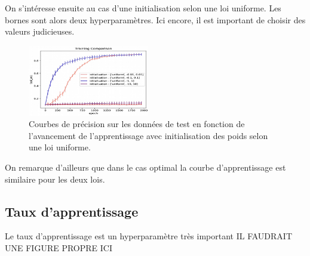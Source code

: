 On s'intéresse ensuite au cas d'une initialisation selon une loi uniforme. Les bornes sont alors deux hyperparamètres. Ici encore, il est important de choisir des valeurs judicieuses.


\begin{figure}[!h]
\centering
\includegraphics[width=150pt]{"images/MLP/MLP_inituni"}
\caption{Courbes de précision sur les données de test en fonction de l'avancement de l'apprentissage avec initialisation des poids selon une loi uniforme.}
\label{MLP_inituni}
\end{figure}

On remarque d'ailleurs que dans le cas optimal la courbe d'apprentissage est similaire pour les deux lois.

\subsection{Taux d'apprentissage}
Le taux d'apprentissage est un hyperparamètre très important
IL FAUDRAIT UNE FIGURE PROPRE ICI